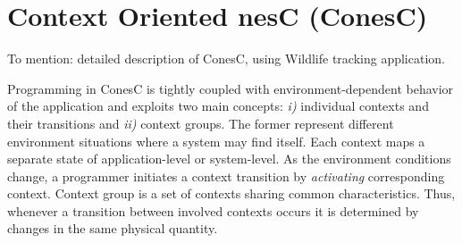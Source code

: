 \section{Context Oriented nesC (ConesC)}
To mention: detailed description of ConesC, using Wildlife tracking application.

Programming in ConesC is tightly coupled with environment-dependent behavior of the application and exploits two main concepts: \emph{i)} individual contexts and their transitions and \emph{ii)} context groups. The former represent different environment situations where a system may find itself. Each context maps a separate state of application-level or system-level. As the environment conditions change, a programmer initiates a context transition by \emph{activating} corresponding context. Context group is a set of contexts sharing common characteristics. Thus, whenever a transition between involved contexts occurs it is determined by changes in the same physical quantity.